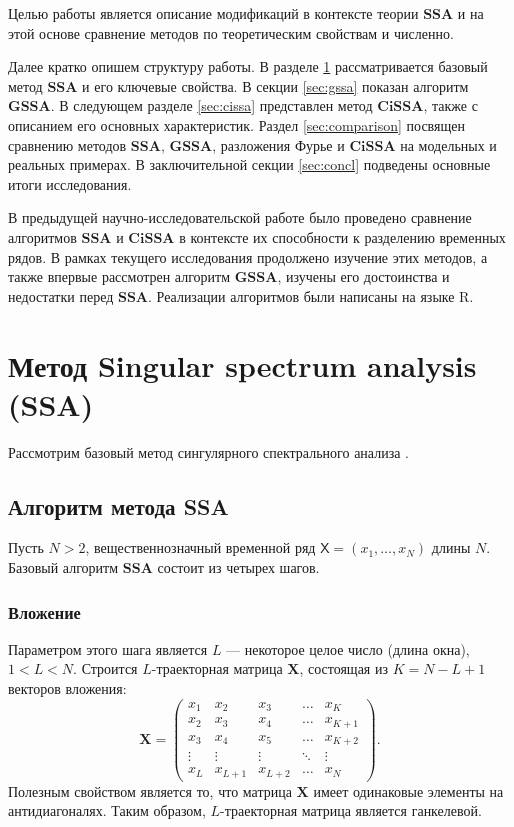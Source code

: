\documentclass[a4paper, 11pt]{article}
\newcommand{\SSA}{\textbf{SSA}}
\newcommand{\GSSA}{\textbf{GSSA}}
\newcommand{\CISSA}{\textbf{CiSSA}}
\newcommand{\TS}{\mathsf{X}}
\begin{document}
Целью работы является описание модификаций в контексте теории $\SSA$ и на этой основе сравнение методов по теоретическим свойствам и численно.

Далее кратко опишем структуру работы. В разделе \ref{sec:ssa} рассматривается базовый метод $\SSA$ и его ключевые свойства. В секции \ref{sec:gssa} показан алгоритм $\GSSA$. В следующем разделе \ref{sec:cissa} представлен метод $\CISSA$, также с описанием его основных характеристик. Раздел \ref{sec:comparison} посвящен сравнению методов $\SSA$, $\GSSA$, разложения Фурье и $\CISSA$ на модельных и реальных примерах. В заключительной секции \ref{sec:concl} подведены основные итоги исследования.

В предыдущей научно-исследовательской работе было проведено сравнение алгоритмов $\SSA$ и $\CISSA$ в контексте их способности к разделению временных рядов. В рамках текущего исследования продолжено изучение этих методов, а также впервые рассмотрен алгоритм $\GSSA$, изучены его достоинства и недостатки перед $\SSA$. Реализации алгоритмов были написаны на языке R.


\newpage

\section{Метод Singular spectrum analysis (SSA)}
\label{sec:ssa}


Рассмотрим базовый метод сингулярного спектрального анализа \cite{golyandina2001analysis}.

\subsection{Алгоритм метода SSA}

Пусть $N > 2$, вещественнозначный временной ряд
$\TS = (x_1, \dots, x_{N})$ длины $N$.
Базовый алгоритм $\SSA$ состоит из четырех шагов.

\subsubsection{Вложение}
Параметром этого шага является $L$ --- некоторое целое число (длина окна), $1 < L < N$. Строится $L$-траекторная матрица $\mathbf{X}$, состоящая из $K = N - L + 1$ векторов вложения:
\begin{equation}
	\label{eq:X}
	\mathbf{X} = 
	\begin{pmatrix}
		x_1 & x_2 & x_3 & \dots & x_{K} \\
		x_2 & x_3 & x_4 & \dots & x_{K+1} \\
		x_3 & x_4 & x_5 & \dots & x_{K+2} \\
		\vdots & \vdots & \vdots & \ddots & \vdots \\
		x_{L} & x_{L+1} & x_{L+2} & \dots & x_{N}
	\end{pmatrix}.
\end{equation}
Полезным свойством является то, что матрица $\mathbf{X}$ имеет одинаковые элементы на антидиагоналях. Таким образом, $L$-траекторная матрица является ганкелевой.
\end{document}

